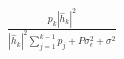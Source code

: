 \documentclass[preview]{standalone}
\begin{document}
\begin{align*}
\frac{p_k\left|{\hat{h}_k}\right|^2}{\left|{\hat{h}_k}\right|^2\sum_{j=1}^{k-1}p_j+P\sigma^2_{\epsilon} + \sigma^2}
\end{align*}
\end{document}
